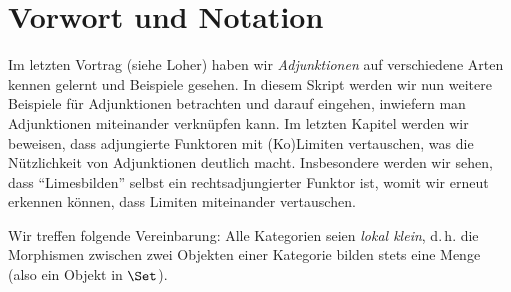 
\chapter{Vorwort und Notation}
Im letzten Vortrag (siehe Loher\cite{talk:loher}) haben wir \emph{Adjunktionen}
auf verschiedene Arten kennen gelernt und Beispiele gesehen. In diesem Skript
werden wir nun weitere Beispiele für Adjunktionen betrachten und darauf
eingehen, inwiefern man Adjunktionen miteinander verknüpfen kann. Im letzten
Kapitel werden wir beweisen, dass adjungierte Funktoren mit (Ko)Limiten
vertauschen, was die Nützlichkeit von Adjunktionen deutlich macht. Insbesondere
werden wir sehen, dass \enquote{Limesbilden} selbst ein rechtsadjungierter 
Funktor ist, womit wir erneut erkennen können, dass Limiten miteinander vertauschen.

\bigskip
Wir treffen folgende Vereinbarung:
Alle Kategorien seien \emph{lokal klein}, d.\,h. die Morphismen zwischen
zwei Objekten einer Kategorie bilden stets eine Menge (also ein Objekt
in $\Set$).

